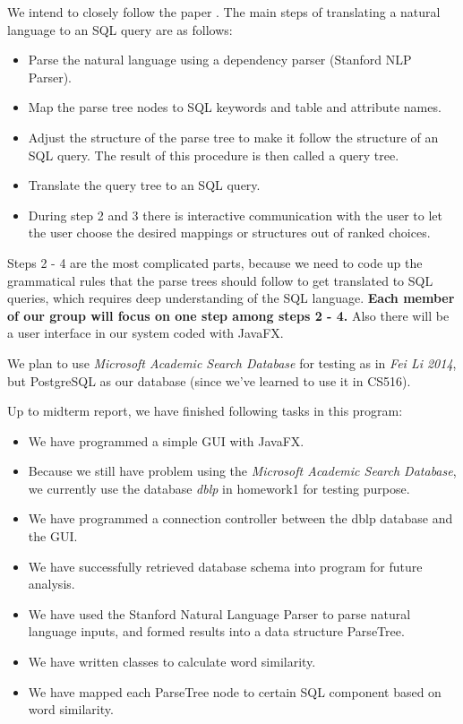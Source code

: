 \documentclass[twocolumn]{article}
\begin{document}
We intend to closely follow the paper \cite{li2014}. The main steps of translating a natural language to an SQL query are as follows:

\begin{itemize}
      \item Parse the natural language using a dependency parser (Stanford NLP Parser).
      \item Map the parse tree nodes to SQL keywords and table and attribute names.
      \item Adjust the structure of the parse tree to make it follow the structure of an SQL query. The result of this procedure is then called a query tree.
      \item Translate the query tree to an SQL query.
      \item During step 2 and 3 there is interactive communication with the user to let the user choose the desired mappings or structures out of ranked choices.
\end{itemize}
        
Steps 2 - 4 are the most complicated parts, because we need to code up the grammatical rules that the parse trees should follow to get translated to SQL queries, which requires deep understanding of the SQL language. \textbf{Each member of our group will focus on one step among steps 2 - 4.} Also there will be a user interface in our system coded with JavaFX.

We plan to use \textit{Microsoft Academic Search Database} for testing as in \textit{Fei Li 2014}, but PostgreSQL as our database (since we've learned to use it in CS516).

Up to midterm report, we have finished following tasks in this program:

\begin{itemize}
	\item We have programmed a simple GUI with JavaFX. 
	\item Because we still have problem using the \textit{Microsoft Academic Search Database}, we currently use the database \textit{dblp} in homework1 for testing purpose.
	\item We have programmed a connection controller between the dblp database and the GUI.
	\item We have successfully retrieved database schema into program for future analysis.
	\item We have used the Stanford Natural Language Parser to parse natural language inputs, and formed results into a data structure ParseTree.
	\item We have written classes to calculate word similarity.
	\item We have mapped each ParseTree node to certain SQL component based on word similarity.
\end{itemize}
	
\end{document}
